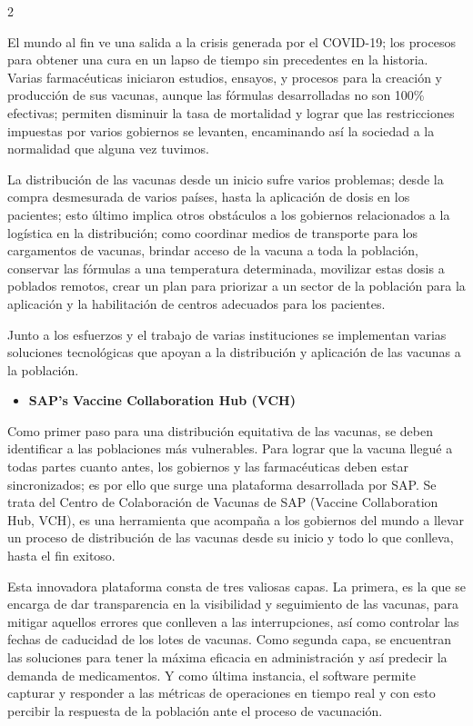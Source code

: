 \documentclass[12pt,spanish,Letterpaper,openany]{book}
\providecommand{\tightlist}{%
  \setlength{\itemsep}{0pt}\setlength{\parskip}{0pt}}
\begin{document}
\begin {multicols}{2}

El mundo al fin ve una salida a la crisis generada por el COVID-19; los procesos para obtener
una cura en un lapso de tiempo sin precedentes en la historia. Varias farmacéuticas iniciaron
estudios, ensayos, y procesos para la creación y producción de sus vacunas, aunque las
fórmulas desarrolladas no son 100\% efectivas; permiten disminuir la tasa de mortalidad y
lograr que las restricciones impuestas por varios gobiernos se levanten, encaminando así la
sociedad a la normalidad que alguna vez tuvimos.

La distribución de las vacunas desde un inicio sufre varios problemas; desde la compra
desmesurada de varios países, hasta la aplicación de dosis en los pacientes; esto último
implica otros obstáculos a los gobiernos relacionados a la logística en la distribución; como
coordinar medios de transporte para los cargamentos de vacunas, brindar acceso de la vacuna
a toda la población, conservar las fórmulas a una temperatura determinada, movilizar estas
dosis a poblados remotos, crear un plan para priorizar a un sector de la población para la
aplicación y la habilitación de centros adecuados para los pacientes.

Junto a los esfuerzos y el trabajo de varias instituciones se implementan varias soluciones
tecnológicas que apoyan a la distribución y aplicación de las vacunas a la población.

\begin{itemize}
\tightlist
\item
  \textbf{SAP's Vaccine Collaboration Hub (VCH)}
\end{itemize}

Como primer paso para una distribución equitativa de las vacunas, se deben identificar a las
poblaciones más vulnerables. Para lograr que la vacuna llegué a todas partes cuanto antes, los
gobiernos y las farmacéuticas deben estar sincronizados; es por ello que surge una plataforma
desarrollada por SAP. Se trata del Centro de Colaboración de Vacunas de SAP (Vaccine
Collaboration Hub, VCH), es una herramienta que acompaña a los gobiernos del mundo a
llevar un proceso de distribución de las vacunas desde su inicio y todo lo que conlleva, hasta
el fin exitoso.

Esta innovadora plataforma consta de tres valiosas capas. La primera, es la que se encarga de
dar transparencia en la visibilidad y seguimiento de las vacunas, para mitigar aquellos errores
que conlleven a las interrupciones, así como controlar las fechas de caducidad de los lotes de
vacunas. Como segunda capa, se encuentran las soluciones para tener la máxima eficacia en
administración y así predecir la demanda de medicamentos. Y como última instancia, el
software permite capturar y responder a las métricas de operaciones en tiempo real y con esto
percibir la respuesta de la población ante el proceso de vacunación.


\end{multicols}
\end{document}
